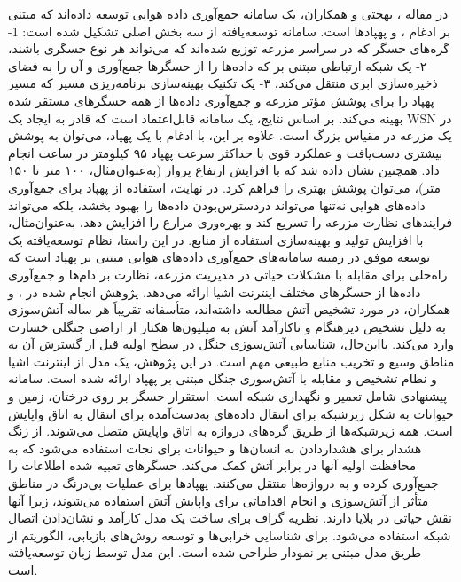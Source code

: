 در مقاله \cite{Behjati2021}، بهجتی و همکاران، یک سامانه جمع‌آوری داده هوایی توسعه داده‌اند که مبتنی بر ادغام ،  و پهپادها است. سامانه توسعه‌یافته از سه بخش اصلی تشکیل شده است: 1- گره‌های حسگر که در سراسر مزرعه توزیع شده‌اند که می‌تواند هر نوع حسگری باشند، ۲- یک شبکه ارتباطی مبتنی بر  که داده‌ها را از حسگرها جمع‌آوری و آن را به فضای ذخیره‌سازی ابری منتقل می‌کند، ۳- یک تکنیک بهینه‌سازی برنامه‌ریزی مسیر که مسیر پهپاد را برای پوشش مؤثر مزرعه و جمع‌آوری داده‌ها از همه حسگرهای مستقر شده بهینه می‌کند. بر اساس نتایج،  یک سامانه قابل‌اعتماد است که قادر به ایجاد یک \gls{WSN} در یک مزرعه در مقیاس بزرگ است. علاوه بر این، با ادغام  با یک پهپاد، می‌توان به پوشش بیشتری دست‌یافت و عملکرد قوی با حداکثر سرعت پهپاد ۹۵ کیلومتر در ساعت انجام داد. همچنین نشان داده شد که با افزایش ارتفاع پرواز (به‌عنوان‌مثال، ۱۰۰ متر تا ۱۵۰ متر)، می‌توان پوشش  بهتری را فراهم کرد. در نهایت، استفاده از پهپاد برای جمع‌آوری داده‌های هوایی نه‌تنها می‌تواند دردسترس‌بودن داده‌ها را بهبود بخشد، بلکه می‌تواند فرایندهای نظارت مزرعه را تسریع کند و بهره‌وری مزارع را افزایش دهد، به‌عنوان‌مثال، با افزایش تولید و بهینه‌سازی استفاده از منابع. در این راستا، نظام توسعه‌یافته یک توسعه موفق در زمینه سامانه‌های جمع‌آوری داده‌های هوایی مبتنی بر پهپاد است که راه‌حلی برای مقابله با مشکلات حیاتی در مدیریت مزرعه، نظارت بر دام‌ها و جمع‌آوری داده‌ها از حسگرهای مختلف اینترنت اشیا ارائه می‌دهد.
پژوهش انجام شده در \cite{Tehseen2021}،  و همکاران، در مورد تشخیص آتش مطالعه داشته‌اند، متأسفانه تقریباً هر ساله آتش‌سوزی به دلیل تشخیص دیرهنگام و ناکارآمد آتش به میلیون‌ها هکتار از اراضی جنگلی خسارت وارد می‌کند. بااین‌حال، شناسایی آتش‌سوزی جنگل در سطح اولیه قبل از گسترش آن به مناطق وسیع و تخریب منابع طبیعی مهم است. در این پژوهش، یک مدل از اینترنت اشیا و نظام تشخیص و مقابله با آتش‌سوزی جنگل مبتنی بر پهپاد ارائه شده است. سامانه پیشنهادی شامل تعمیر و نگهداری شبکه است. استقرار حسگر بر روی درختان، زمین و حیوانات به شکل زیرشبکه برای انتقال داده‌های به‌دست‌آمده برای انتقال به اتاق واپایش است. همه زیرشبکه‌ها از طریق گره‌های دروازه به اتاق واپایش متصل می‌شوند. از زنگ هشدار برای هشداردادن به انسان‌ها و حیوانات برای نجات استفاده می‌شود که به محافظت اولیه آنها در برابر آتش کمک می‌کند. حسگرهای تعبیه شده اطلاعات را جمع‌آوری کرده و به دروازه‌ها منتقل می‌کنند. پهپادها برای عملیات بی‌درنگ در مناطق متأثر از آتش‌سوزی و انجام اقداماتی برای واپایش آتش استفاده می‌شوند، زیرا آنها نقش حیاتی در بلایا دارند. نظریه گراف برای ساخت یک مدل کارآمد و نشان‌دادن اتصال شبکه استفاده می‌شود. برای شناسایی خرابی‌ها و توسعه روش‌های بازیابی، الگوریتم از طریق مدل مبتنی بر نمودار طراحی شده است. این مدل توسط زبان  توسعه‌یافته است.
